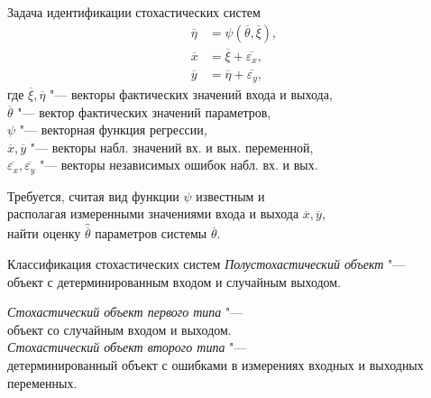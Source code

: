 \documentclass[hyperref={pdftex,unicode}]{beamer}
\begin{document}
\begin{frame}
  \maketitle
\end{frame}

\addtocounter{framenumber}{-1}

\begin{frame}{Задача идентификации стохастических систем}
  \begin{align*}
    \overline{\eta} &= \psi (\overline{\theta}, \overline{\xi}), \\
    \overline{x} &= \overline{\xi} + \overline{\varepsilon_x}, \\
    \overline{y} &= \overline{\eta} + \overline{\varepsilon_y},
  \end{align*}
  где \( \overline{\xi}, \overline{\eta} \)
  "--- векторы фактических значений входа и выхода, \\
  \hspace{10.5mm}\( \overline{\theta} \)
  "--- вектор фактических значений параметров, \\
  \hspace{10mm}\( \psi \)
  "--- векторная функция регрессии, \\
  \hspace{7mm}\( \overline{x}, \overline{y} \)
  "--- векторы набл. значений вх. и вых. переменной, \\
  \hspace{4mm}\( \overline{\varepsilon_x}, \overline{\varepsilon_y} \)
  "--- векторы независимых ошибок набл. вх. и вых.

  \bigskip
  Требуется, считая вид функции \( \psi \) известным и \\
  располагая измеренными значениями входа и выхода \( \overline{x}, \overline{y} \), \\
  найти оценку \( \hat{\overline{\theta}} \) параметров системы \( \overline{\theta} \).
\end{frame}

\begin{frame}{Классификация стохастических систем}
  \emph{Полустохастический объект} "--- \\
  объект с детерминированным входом и случайным выходом.

  \bigskip
  \emph{Стохастический объект первого типа} "--- \\
  объект со случайным входом и выходом. \\

  \bigskip
  \emph{Стохастический объект второго типа} "--- \\
  детерминированный объект с ошибками в измерениях входных и выходных переменных.
\end{frame}
\end{document}

